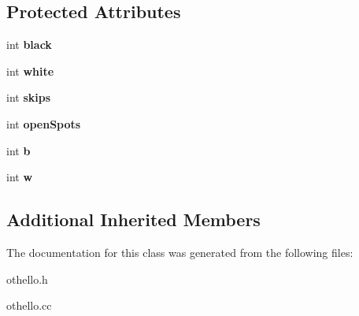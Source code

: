 \subsection*{Protected Attributes}
\begin{DoxyCompactItemize}
\item 
int {\bfseries black}\hypertarget{classmain__savitch__14_1_1Othello_a2eed818925f68d5678b78107a3298138}{}\label{classmain__savitch__14_1_1Othello_a2eed818925f68d5678b78107a3298138}

\item 
int {\bfseries white}\hypertarget{classmain__savitch__14_1_1Othello_a7d5f59b1e581ed7a8145debeecf4f310}{}\label{classmain__savitch__14_1_1Othello_a7d5f59b1e581ed7a8145debeecf4f310}

\item 
int {\bfseries skips}\hypertarget{classmain__savitch__14_1_1Othello_a85d4ce17512d8dbf85a313a27eea0644}{}\label{classmain__savitch__14_1_1Othello_a85d4ce17512d8dbf85a313a27eea0644}

\item 
int {\bfseries open\+Spots}\hypertarget{classmain__savitch__14_1_1Othello_a15045e3e94c34afe08240885e230d502}{}\label{classmain__savitch__14_1_1Othello_a15045e3e94c34afe08240885e230d502}

\item 
int {\bfseries b}\hypertarget{classmain__savitch__14_1_1Othello_a98fbc46241d2f5e05ccb4b66f11535bf}{}\label{classmain__savitch__14_1_1Othello_a98fbc46241d2f5e05ccb4b66f11535bf}

\item 
int {\bfseries w}\hypertarget{classmain__savitch__14_1_1Othello_a1b11c5fe33e30a94ed39e8cb55caf37e}{}\label{classmain__savitch__14_1_1Othello_a1b11c5fe33e30a94ed39e8cb55caf37e}

\end{DoxyCompactItemize}
\subsection*{Additional Inherited Members}


The documentation for this class was generated from the following files\+:\begin{DoxyCompactItemize}
\item 
othello.\+h\item 
othello.\+cc\end{DoxyCompactItemize}
